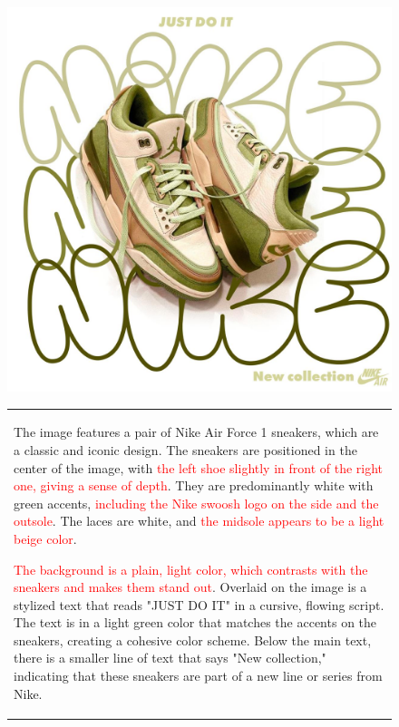 \begin{figure}[t]
\begin{minipage}[c]{0.3\textwidth}
        \centering
        \includegraphics[width=\textwidth]{images/nike-qualitative.jpeg}
    \end{minipage}
    \begin{minipage}[c]{0.72\textwidth}
\small
\centering
\scriptsize
\begin{tabular}{p{8.5cm}}\scriptsize
The image features a pair of Nike Air Force 1 sneakers, which are a classic and iconic design. The sneakers are positioned in the center of the image, with \textcolor{red}{the left shoe slightly in front of the right one, giving a sense of depth}. They are predominantly white with green accents, \textcolor{red}{including the Nike swoosh logo on the side and the outsole}. The laces are white, and \textcolor{red}{the midsole appears to be a light beige color}.

\textcolor{red}{The background is a plain, light color, which contrasts with the sneakers and makes them stand out}. Overlaid on the image is a stylized text that reads "JUST DO IT" in a cursive, flowing script. The text is in a light green color that matches the accents on the sneakers, creating a cohesive color scheme. Below the main text, there is a smaller line of text that says "New collection," indicating that these sneakers are part of a new line or series from Nike.


\end{tabular}
\end{minipage}
\end{figure}
